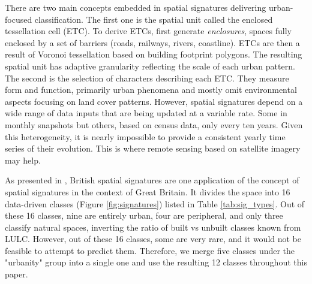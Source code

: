 There are two main concepts embedded in spatial signatures delivering urban-focused
classification. The first one is the spatial unit called the enclosed tessellation cell
(ETC). To derive ETCs, \citep{dab_mf_2021a} first generate \textit{enclosures}, spaces fully enclosed by
a set of barriers (roads, railways, rivers, coastline). ETCs are then a result of
Voronoi tessellation based on building footprint polygons. The resulting spatial unit
has adaptive granularity reflecting the scale of each urban pattern. The
second is the selection of characters describing each ETC. They measure form and function,
primarily urban phenomena and mostly omit environmental aspects focusing on land
cover patterns. However, spatial signatures depend on a wide range of data inputs that
are being updated at a variable rate. Some in monthly snapshots but others,
based on census data, only every ten years. Given this heterogeneity,
it is nearly impossible to provide a consistent yearly time series of their evolution.
This is where remote sensing based on satellite imagery may help.


As presented in \cite{fleischmann2022geographical}, British spatial signatures are one
application of the concept of spatial signatures in
the context of Great Britain. It divides the space into 16 data-driven classes
(Figure \ref{fig:signatures}) listed in Table \ref{tab:sig_types}. Out of these 16
classes, nine are entirely urban, four are peripheral, and only three classify natural spaces,
inverting the ratio of built vs unbuilt classes known from LULC. However, out
of these 16 classes, some are very rare, and it would not be feasible to attempt to
predict them. Therefore, we merge five classes under the "urbanity" group into a
single one and use the resulting 12 classes throughout this paper.


